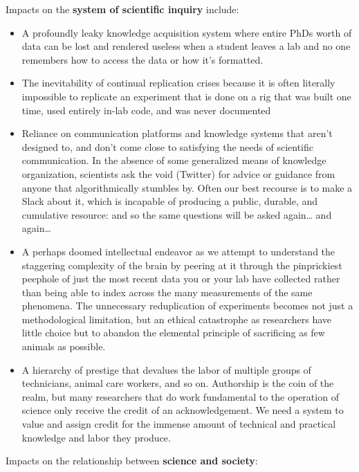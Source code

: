 \documentclass[10pt]{tufte-book}
\begin{document}
Impacts on the \textbf{system of scientific inquiry} include:

\begin{itemize}

\item
  A profoundly leaky knowledge acquisition system where entire PhDs
  worth of data can be lost and rendered useless when a student leaves a
  lab and no one remembers how to access the data or how it's formatted.
\item
  The inevitability of continual replication crises because it is often
  literally impossible to replicate an experiment that is done on a rig
  that was built one time, used entirely in-lab code, and was never
  documented
\item
  Reliance on communication platforms and knowledge systems that aren't
  designed to, and don't come close to satisfying the needs of
  scientific communication. In the absence of some generalized means of
  knowledge organization, scientists ask the void (Twitter) for advice
  or guidance from anyone that algorithmically stumbles by. Often our
  best recourse is to make a Slack about it, which is incapable of
  producing a public, durable, and cumulative resource: and so the same
  questions will be asked again\ldots{} and again\ldots{}
\item
  A perhaps doomed intellectual endeavor as we attempt to understand the staggering
  complexity of the brain by peering at it through the pinprickiest
  peephole of just the most recent data you or your lab have collected
  rather than being able to index across the many measurements of the
  same phenomena. The unnecessary reduplication of experiments becomes
  not just a methodological limitation, but an ethical catastrophe as
  researchers have little choice but to abandon the elemental principle
  of sacrificing as few animals as possible.
\item
  A hierarchy of prestige that devalues the labor of multiple groups of
  technicians, animal care workers, and so on. Authorship is the coin of
  the realm, but many researchers that do work fundamental to the
  operation of science only receive the credit of an acknowledgement. We
  need a system to value and assign credit for the immense amount of
  technical and practical knowledge and labor they produce.
\end{itemize}

Impacts on the relationship between \textbf{science and society}:
\end{document}
